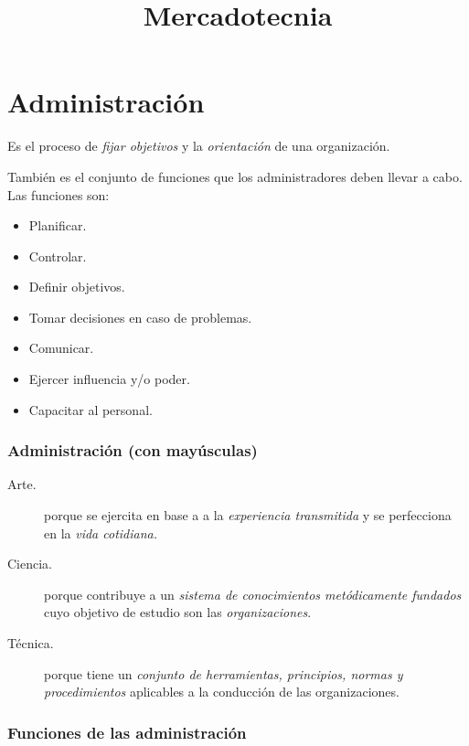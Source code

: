 \documentclass[12pt, spanish, a5paper]{article}
\begin{document}
\title{\textbf{Mercadotecnia}}
\date{}

\maketitle



\tableofcontents

\bigskip
\listoffigures



\newpage



\part{Administración}
Es el proceso de \emph{fijar objetivos} y la \emph{orientación} de una organización.

También es el conjunto de funciones que los administradores deben llevar a cabo. Las funciones son:
\begin{itemize}
	\item Planificar.
	\item Controlar.
	\item Definir objetivos.
	\item Tomar decisiones en caso de problemas.
	\item Comunicar.
	\item Ejercer influencia y/o poder.
	\item Capacitar al personal.
\end{itemize}

\section{Administración (con mayúsculas)}
\begin{description}
	\item[Arte.]	porque se ejercita en base a a la \emph{experiencia transmitida} y  se perfecciona en la \emph{vida cotidiana.}
\item[Ciencia.] porque contribuye a un \emph{sistema de conocimientos metódicamente fundados} cuyo objetivo de estudio son las \emph{organizaciones}.
\item[Técnica.] porque tiene un \emph{conjunto de herramientas, principios, normas y procedimientos} aplicables a la conducción de las organizaciones.
\end{description}

\section{Funciones de las administración}
\end{document}
